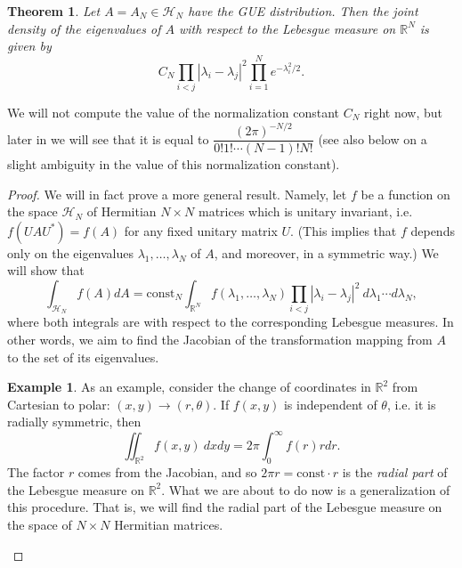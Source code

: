 \documentclass[letterpaper,11pt,oneside,reqno]{amsart}
\numberwithin{equation}{section}
\newtheorem{theorem}[proposition]{Theorem}
\theoremstyle{definition}
\newtheorem{example}[proposition]{Example}
\begin{document}
\begin{theorem}\label{thm:eigenvalue_density}
  Let $A=A_N\in\mathcal H_N$ have the GUE distribution. 
  Then the joint density of the eigenvalues of $A$ 
  with respect to the Lebesgue measure on $\mathbb{R}^{N}$ is given by
  \begin{equation*}
    C_N \prod_{i<j} |\lambda_i-\lambda_j|^2 \prod_{i=1}^N e^{-\lambda_i^2/2}.
  \end{equation*}
\end{theorem}
We will not compute the value of the normalization
constant $C_N$ right now, but later in  we will see that it is equal to 
$\dfrac{(2\pi)^{-N/2}}{0! 1!\cdots (N-1)!N!}$ (see also  below
on a slight ambiguity in the value of this normalization constant).
\begin{proof}
  We will in fact prove a more general result.
  Namely,
  let $f$ be a function on the space $\mathcal H_N$ of 
  Hermitian $N\times N$ matrices 
  which is unitary invariant, 
  i.e. $f(U A U^*)=f(A)$ for any fixed unitary matrix $U$. 
  (This implies that $f$ depends only on the eigenvalues $\lambda_1,\ldots, \lambda_N$ of $A$, and 
  moreover, in a symmetric way.) We will show that
  \begin{equation}\label{radial_part_Lebesgue_unitary}
    \int_{\mathcal H_N}f(A) dA=\mathrm{const}_N\int_{\mathbb{R}^N} f(\lambda_1,\ldots, \lambda_N) 
    \prod_{i<j} |\lambda_i-\lambda_j|^2 ~ d\lambda_1\cdots d\lambda_N,
  \end{equation}
  where both integrals are with respect to the corresponding Lebesgue measures. 
  In other words, we aim to find
  the Jacobian of the transformation mapping from $A$ to the set of its eigenvalues.

  \begin{example}
	As an example, consider the change of coordinates in $\mathbb{R}^2$ from Cartesian to polar: $(x,y)\to (r,\theta)$. If $f(x,y)$ is independent of $\theta$, i.e. it is radially symmetric, then
	\begin{equation*}
	\iint_{\mathbb{R}^2} f(x,y) ~ dxdy =2\pi \int_0^\infty f(r) r dr.
	\end{equation*}
	The factor $r$ comes from the Jacobian, and so 
	$2\pi r=\mathrm{const}\cdot r$ is the \emph{radial part} of the 
	Lebesgue measure on $\mathbb{R}^2$. 
	What we are about to do now is a generalization of this procedure.
	That is, we will find the radial part of the Lebesgue measure on the 
	space of $N\times N$ Hermitian matrices.
  \end{example}


\end{proof}
\end{document}
